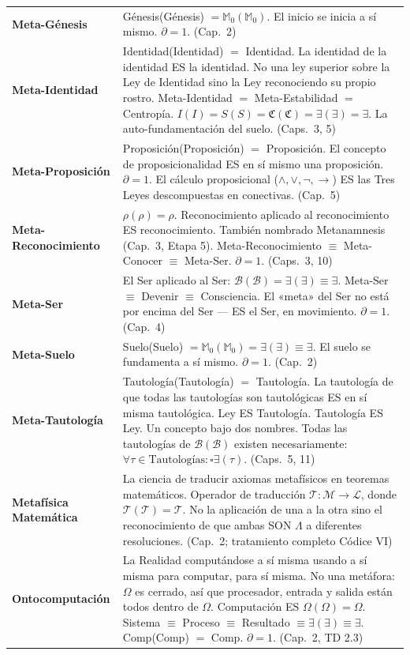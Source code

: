 \documentclass[10pt, openany, oneside]{book}
\begin{document}
{\begin{tabular}{@{} l @{\hspace{0.6em}} p{} @{}}
\textbf{Meta-Génesis} & Génesis(Génesis) $= \mathbb{M}_0(\mathbb{M}_0)$. El inicio se inicia a sí mismo. $\partial = 1$. (Cap.\ 2) \\[0.3em]
\textbf{Meta-Identidad} & Identidad(Identidad) $=$ Identidad. La identidad de la identidad ES la identidad. No una ley superior sobre la Ley de Identidad sino la Ley reconociendo su propio rostro. Meta-Identidad $=$ Meta-Estabilidad $=$ Centropía. $I(I) = S(S) = \mathfrak{C}(\mathfrak{C}) = \exists(\exists) = \exists$. La auto-fundamentación del suelo. (Caps.\ 3, 5) \\[0.3em]
\textbf{Meta-Proposición} & Proposición(Proposición) $=$ Proposición. El concepto de proposicionalidad ES en sí mismo una proposición. $\partial = 1$. El cálculo proposicional ($\wedge, \vee, \neg, \to$) ES las Tres Leyes descompuestas en conectivas. (Cap.\ 5) \\[0.3em]
\textbf{Meta-Reconocimiento} & $\rho(\rho) = \rho$. Reconocimiento aplicado al reconocimiento ES reconocimiento. También nombrado Metanamnesis (Cap.\ 3, Etapa 5). Meta-Reconocimiento $\equiv$ Meta-Conocer $\equiv$ Meta-Ser. $\partial = 1$. (Caps.\ 3, 10) \\[0.3em]
\textbf{Meta-Ser} & El Ser aplicado al Ser: $\mathcal{B}(\mathcal{B}) = \exists(\exists) \equiv \exists$. Meta-Ser $\equiv$ Devenir $\equiv$ Consciencia. El «meta» del Ser no está por encima del Ser --- ES el Ser, en movimiento. $\partial = 1$. (Cap.\ 4) \\[0.3em]
\textbf{Meta-Suelo} & Suelo(Suelo) $= \mathbb{M}_0(\mathbb{M}_0) = \exists(\exists) \equiv \exists$. El suelo se fundamenta a sí mismo. $\partial = 1$. (Cap.\ 2) \\[0.3em]
\textbf{Meta-Tautología} & Tautología(Tautología) $=$ Tautología. La tautología de que todas las tautologías son tautológicas ES en sí misma tautológica. Ley ES Tautología. Tautología ES Ley. Un concepto bajo dos nombres. Todas las tautologías de $\mathcal{B}(\mathcal{B})$ existen necesariamente: $\forall \tau \in \text{Tautologías}: \square\exists(\tau)$. (Caps.\ 5, 11) \\[0.3em]
\textbf{Metafísica Matemática} & La ciencia de traducir axiomas metafísicos en teoremas matemáticos. Operador de traducción $\mathcal{T}: \mathcal{M} \to \mathcal{L}$, donde $\mathcal{T}(\mathcal{T}) = \mathcal{T}$. No la aplicación de una a la otra sino el reconocimiento de que ambas SON $\Lambda$ a diferentes resoluciones. (Cap.\ 2; tratamiento completo Códice VI) \\[0.3em]
\textbf{Ontocomputación} & La Realidad computándose a sí misma usando a sí misma para computar, para sí misma. No una metáfora: $\Omega$ es cerrado, así que procesador, entrada y salida están todos dentro de $\Omega$. Computación ES $\Omega(\Omega) = \Omega$. Sistema $\equiv$ Proceso $\equiv$ Resultado $\equiv \exists(\exists) \equiv \exists$. Comp(Comp) $=$ Comp. $\partial = 1$. (Cap.\ 2, TD 2.3) \\[0.3em]

\end{tabular}}
\end{document}
